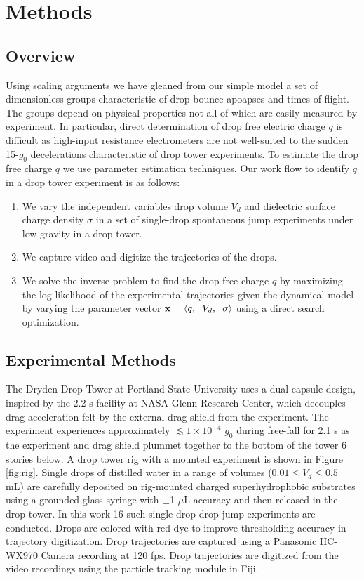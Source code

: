 \documentclass[aip,reprint, floatfix]{revtex4-1}
\begin{document}
\section{Methods}
\subsection{Overview}
Using scaling arguments we have gleaned from our simple model a set of dimensionless groups characteristic of drop bounce apoapses and times of flight. The groups depend on physical properties not all of which are easily measured by experiment. In particular, direct determination of drop free electric charge $q$ is difficult as high-input resistance electrometers are not well-suited to the sudden 15-$g_0$ decelerations characteristic of drop tower experiments. To estimate the drop free charge $q$ we use parameter estimation techniques. Our work flow to identify $q$ in a drop tower experiment is as follows:
\begin{enumerate}
\item We vary the independent variables drop volume $V_d$ and dielectric surface charge density $\sigma$ in a set of single-drop spontaneous  jump experiments under low-gravity in a drop tower. 
\item We capture video and digitize the trajectories of the drops. 
\item We solve the inverse problem to find the drop free charge $q$ by maximizing the log-likelihood of the experimental trajectories given the dynamical model by varying the parameter vector $\mathbf{x} = \left\langle q, \hspace{2 mm} V_d, \hspace{2 mm} \sigma \right\rangle$ using a direct search optimization.                     
\end{enumerate}

\subsection{Experimental Methods}
The Dryden Drop Tower at Portland State University uses a dual capsule design, inspired by the 2.2 s facility at NASA Glenn Research Center, which decouples drag acceleration felt by the external drag shield from the experiment. The experiment experiences approximately $\lesssim 1 \times 10^{-4}$ $g_0$ during free-fall for 2.1 s as the experiment and drag shield plummet together to the bottom of the tower 6 stories below. A drop tower rig with a mounted experiment is shown in Figure \ref{fig:rig}. Single drops of distilled water in a range of volumes ($0.01 \leq V_d \leq 0.5$ mL) are carefully deposited on rig-mounted charged superhydrophobic substrates using a grounded glass syringe with $\pm $1 $\mu$L accuracy and then released in the drop tower. In this work 16 such single-drop drop jump experiments are conducted. Drops are colored with red dye to improve thresholding accuracy in trajectory digitization. Drop trajectories are captured using a Panasonic HC-WX970 Camera recording at 120 fps. Drop trajectories are digitized from the video recordings using the particle tracking module in Fiji. \cite{schindelin_fiji:_2012}
\end{document}
